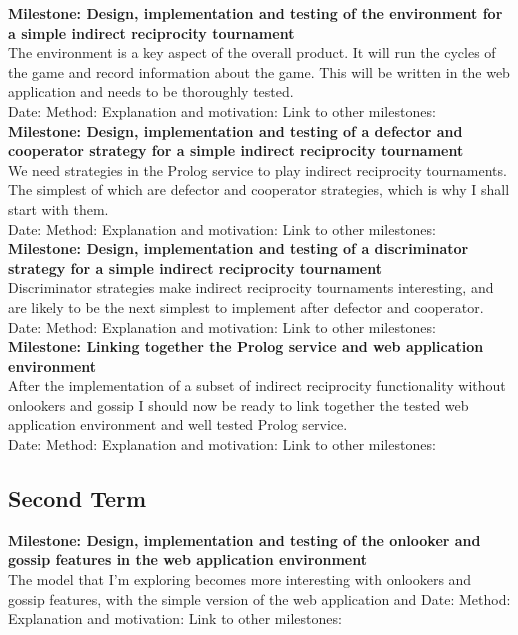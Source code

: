 \documentclass{article}
\begin{document}
\noindent\textbf{Milestone: Design, implementation and testing of the environment for a simple indirect reciprocity tournament}\\
The environment is a key aspect of the overall product. It will run the cycles of the game and record information about the game. This will be written in the web application and needs to be thoroughly tested.\\
Date:
Method: 
Explanation and motivation:
Link to other milestones:\\

\noindent\textbf{Milestone: Design, implementation and testing of a defector and cooperator strategy for a simple indirect reciprocity tournament}\\
We need strategies in the Prolog service to play indirect reciprocity tournaments. The simplest of which are defector and cooperator strategies, which is why I shall start with them.\\
Date:
Method: 
Explanation and motivation:
Link to other milestones:\\

\noindent\textbf{Milestone: Design, implementation and testing of a discriminator strategy for a simple indirect reciprocity tournament}\\
Discriminator strategies make indirect reciprocity tournaments interesting, and are likely to be the next simplest to implement after defector and cooperator.\\
Date:
Method: 
Explanation and motivation:
Link to other milestones:\\

\noindent\textbf{Milestone: Linking together the Prolog service and web application environment}\\
After the implementation of a subset of indirect reciprocity functionality without onlookers and gossip I should now be ready to link together the tested web application environment and well tested Prolog service.\\
Date:
Method: 
Explanation and motivation:
Link to other milestones:\\

\subsection*{Second Term}

\noindent\textbf{Milestone: Design, implementation and testing of the onlooker and gossip features in the web application environment}\\
The model that I'm exploring becomes more interesting with onlookers and gossip features, with the simple version of the web application and
Date:
Method: 
Explanation and motivation:
Link to other milestones:\\
\end{document}
